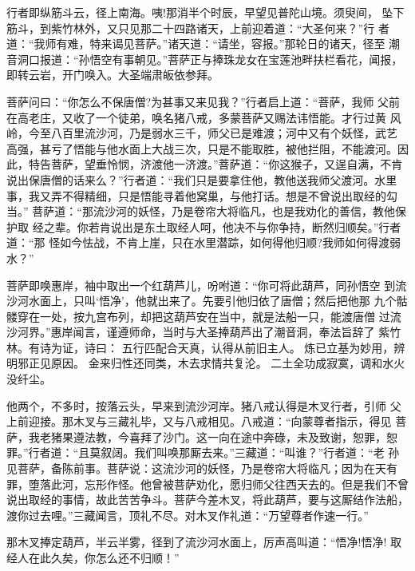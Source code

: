 行者即纵筋斗云，径上南海。咦!那消半个时辰，早望见普陀山境。须臾间，
坠下筋斗，到紫竹林外，又只见那二十四路诸天，上前迎着道：“大圣何来？”行
者道：“我师有难，特来谒见菩萨。”诸天道：“请坐，容报。”那轮日的诸天，径至
潮音洞口报道：“孙悟空有事朝见。”菩萨正与捧珠龙女在宝莲池畔扶栏看花，闻报，
即转云岩，开门唤入。大圣端肃皈依参拜。

菩萨问曰：“你怎么不保唐僧?为甚事又来见我？”行者启上道：“菩萨，我师
父前在高老庄，又收了一个徒弟，唤名猪八戒，多蒙菩萨又赐法讳悟能。才行过黄
风岭，今至八百里流沙河，乃是弱水三千，师父已是难渡；河中又有个妖怪，武艺
高强，甚亏了悟能与他水面上大战三次，只是不能取胜，被他拦阻，不能渡河。因
此，特告菩萨，望垂怜悯，济渡他一济渡。”菩萨道：“你这猴子，又逞自满，不肯
说出保唐僧的话来么？”行者道：“我们只是要拿住他，教他送我师父渡河。水里
事，我又弄不得精细，只是悟能寻着他窝巢，与他打话。想是不曾说出取经的勾当。”
菩萨道：“那流沙河的妖怪，乃是卷帘大将临凡，也是我劝化的善信，教他保护取
经之辈。你若肯说出是东土取经人呵，他决不与你争持，断然归顺矣。”行者道：“那
怪如今怯战，不肯上崖，只在水里潜踪，如何得他归顺?我师如何得渡弱水？”

菩萨即唤惠岸，袖中取出一个红葫芦儿，吩咐道：“你可将此葫芦，同孙悟空
到流沙河水面上，只叫‘悟净’，他就出来了。先要引他归依了唐僧；然后把他那
九个骷髅穿在一处，按九宫布列，却把这葫芦安在当中，就是法船一只，能渡唐僧
过流沙河界。”惠岸闻言，谨遵师命，当时与大圣捧葫芦出了潮音洞，奉法旨辞了
紫竹林。有诗为证，诗曰：
五行匹配合天真，认得从前旧主人。
炼已立基为妙用，辨明邪正见原因。
金来归性还同类，木去求情共复沦。
二土全功成寂寞，调和水火没纤尘。

他两个，不多时，按落云头，早来到流沙河岸。猪八戒认得是木叉行者，引师
父上前迎接。那木叉与三藏礼毕，又与八戒相见。八戒道：“向蒙尊者指示，得见
菩萨，我老猪果遵法教，今喜拜了沙门。这一向在途中奔碌，未及致谢，恕罪，恕
罪。”行者道：“且莫叙阔。我们叫唤那厮去来。”三藏道：“叫谁？”行者道：“老
孙见菩萨，备陈前事。菩萨说：这流沙河的妖怪，乃是卷帘大将临凡；因为在天有
罪，堕落此河，忘形作怪。他曾被菩萨劝化，愿归师父往西天去的。但是我们不曾
说出取经的事情，故此苦苦争斗。菩萨今差木叉，将此葫芦，要与这厮结作法船，
渡你过去哩。”三藏闻言，顶礼不尽。对木叉作礼道：“万望尊者作速一行。”

那木叉捧定葫芦，半云半雾，径到了流沙河水面上，厉声高叫道：“悟净!悟净!
取经人在此久矣，你怎么还不归顺！”

